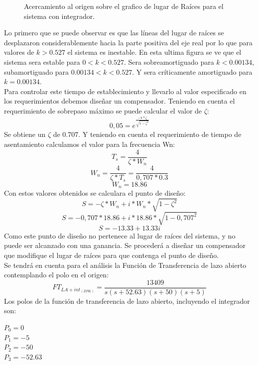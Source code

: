 \documentclass[a4paper,11pt]{article}
\begin{document}
	  \begin{figure}[H] %
	\caption{Acercamiento al origen sobre el grafico de lugar de Raíces para el sistema con integrador.}
	\label{fig:FTlazoc_poloenorig_rlocus_zoom}
	\end{figure} 

Lo primero que se puede observar es que las líneas del lugar de raíces se desplazaron considerablemente hacia la parte positiva del eje real por lo que para valores de $k>0.527$ el sistema es inestable.
En esta ultima figura se ve que el sistema sera estable para $0<k<0.527$. Sera sobreamortiguado para $k<0.00134$, subamortiguado para $0.00134<k<0.527$. Y sera críticamente amortiguado para $k = 0.00134$.\\
Para controlar este tiempo de establecimiento y llevarlo al valor especificado en los requerimientos debemos diseñar un compensador. Teniendo en cuenta el requerimiento de sobrepaso máximo se puede calcular el valor de $\zeta$:\\
$$0,05=e^{\frac{-\pi*\zeta}{\sqrt{1-\zeta^{2}}}}$$
Se obtiene un $\zeta$ de 0.707. Y teniendo en cuenta el requerimiento de tiempo de asentamiento calculamos el valor para la frecuencia Wn:
$$T_s=\frac{4}{\zeta*W_n} $$
$$W_n=\frac{4}{\zeta*T_s}=\frac{4}{0,707*0.3}$$
$$W_n=18.86$$
Con estos valores obtenidos se calculara el punto de diseño:
$$S = - \zeta*W_n + i*W_n*\sqrt{1-\zeta^2}$$
$$S = - 0,707*18.86 + i*18.86*\sqrt{1-0,707^2}$$
$$S = -13.33+13.33i$$
Como este punto de diseño no pertenece al lugar de raíces del sistema, y no puede ser alcanzado con una ganancia. Se procederá a diseñar un compensador que modifique el lugar de raíces para que contenga el punto de diseño.\\
Se tendrá en cuenta para el análisis la Función de Transferencia de lazo abierto contemplando el polo en el origen:
$$FT_{LA+int_{(ZPK)}}=\frac{13409}{s(s + 52.63)(s + 50)(s + 5)}$$
Los polos de la función de transferencia de lazo abierto, incluyendo el integrador son:\\
\begin{center}
$P_0=0$\\
$P_1=-5$\\
$P_2=-50$\\
$P_3=-52.63$\\
\end{center}
\end{document}
